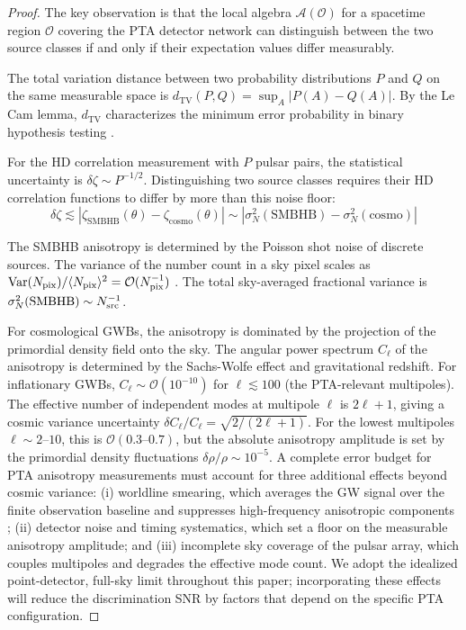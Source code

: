 \documentclass[11pt,a4paper]{article}
\begin{document}
\begin{proof}
The key observation is that the local algebra $\mathcal{A}(\mathcal{O})$ for a spacetime region $\mathcal{O}$ covering the PTA detector network can distinguish between the two source classes if and only if their expectation values differ measurably.

The total variation distance between two probability distributions $P$ and $Q$ on the same measurable space is $d_{\mathrm{TV}}(P, Q) = \sup_A |P(A) - Q(A)|$. By the Le Cam lemma, $d_{\mathrm{TV}}$ characterizes the minimum error probability in binary hypothesis testing \cite{Hollands:2003}.

For the HD correlation measurement with $P$ pulsar pairs, the statistical uncertainty is $\delta\zeta \sim P^{-1/2}$. Distinguishing two source classes requires their HD correlation functions to differ by more than this noise floor:
\begin{equation}
\delta\zeta \lesssim \left| \zeta_{\mathrm{SMBHB}}(\theta) - \zeta_{\mathrm{cosmo}}(\theta) \right| \sim \left| \sigma_N^2(\mathrm{SMBHB}) - \sigma_N^2(\mathrm{cosmo}) \right|
\end{equation}

The SMBHB anisotropy is determined by the Poisson shot noise of discrete sources. The variance of the number count in a sky pixel scales as $\mathrm{Var}(N_{\rm pix})/\langle N_{\rm pix} \rangle^2 = \mathcal{O}(N_{\rm pix}^{-1})$ \cite{Lin:2026}. The total sky-averaged fractional variance is $\sigma_N^2(\mathrm{SMBHB}) \sim N_{\rm src}^{-1}$.

For cosmological GWBs, the anisotropy is dominated by the projection of the primordial density field onto the sky. The angular power spectrum $C_\ell$ of the anisotropy is determined by the Sachs-Wolfe effect and gravitational redshift. For inflationary GWBs, $C_\ell \sim \mathcal{O}(10^{-10})$ for $\ell \lesssim 100$ (the PTA-relevant multipoles). The effective number of independent modes at multipole $\ell$ is $2\ell + 1$, giving a cosmic variance uncertainty $\delta C_\ell / C_\ell = \sqrt{2/(2\ell+1)}$. For the lowest multipoles $\ell \sim 2\text{--}10$, this is $\mathcal{O}(0.3\text{--}0.7)$, but the absolute anisotropy amplitude is set by the primordial density fluctuations $\delta\rho/\rho \sim 10^{-5}$. A complete error budget for PTA anisotropy measurements must account for three additional effects beyond cosmic variance: (i) worldline smearing, which averages the GW signal over the finite observation baseline and suppresses high-frequency anisotropic components \cite{Allen:2023}; (ii) detector noise and timing systematics, which set a floor on the measurable anisotropy amplitude; and (iii) incomplete sky coverage of the pulsar array, which couples multipoles and degrades the effective mode count. We adopt the idealized point-detector, full-sky limit throughout this paper; incorporating these effects will reduce the discrimination SNR by factors that depend on the specific PTA configuration.


\end{proof}
\end{document}
